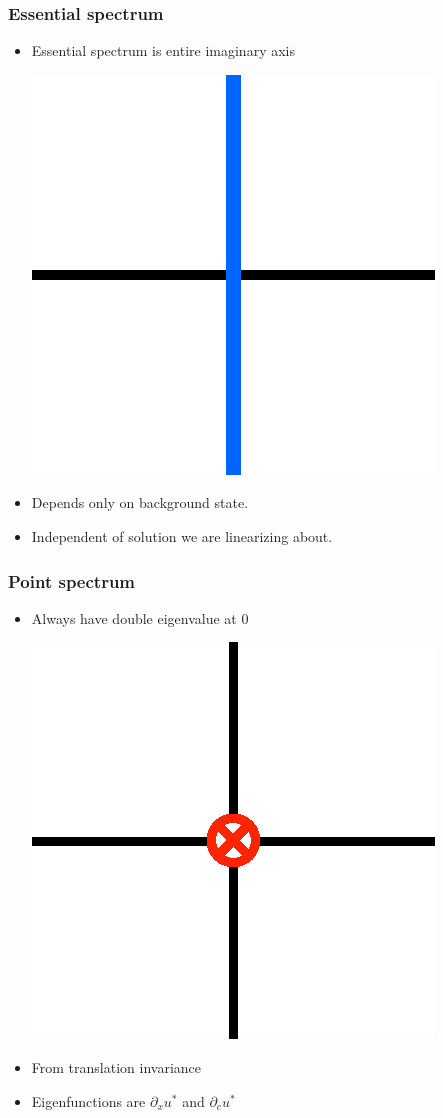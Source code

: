 \documentclass[16pt]{beamer}
\begin{document}
\begin{frame}
	\frametitle{Essential spectrum}
	\fontsize{16}{7.2}\selectfont
	\begin{itemize}
		\item Essential spectrum is entire imaginary axis
			\begin{center}
			\includegraphics[width=0.3\linewidth]{images/essspec1.eps}
			\end{center}

		\item Depends only on background state.
		\vspace{0.5cm}
		\item Independent of solution we are linearizing about.
	\end{itemize}
\end{frame}

\begin{frame}
	\frametitle{Point spectrum}
	\fontsize{16}{7.2}\selectfont
	\begin{itemize}
		\item Always have double eigenvalue at 0
		\begin{center}
			\includegraphics[width=0.3\linewidth]{images/eigsingle.eps}
		\end{center}
		\item From translation invariance
		\vspace{0.5cm}
		\item Eigenfunctions are $\partial_x u^*$ and $\partial_c u^*$
	\end{itemize}
\end{frame}
\end{document}
